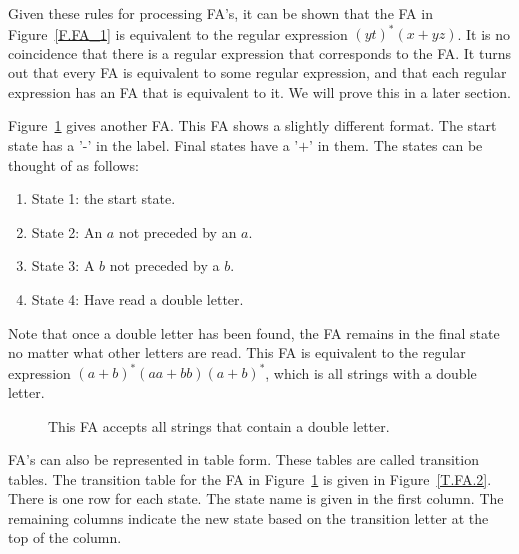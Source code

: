 \documentclass[letterpaper,12pt,openany,reqno]{book}%
\newcommand{\fanonterminalnode}[2] {\node at (#1) (#2) [circle, draw, minimum size=24pt] {#2};}
\newcommand{\fatransition}[3] {\draw [->] (#1) -- (#2) node [midway, above] {#3};}
\newcommand{\faarctransition}[5] {\draw [->] (#1) to[out=#4, in=#5] node  [midway, above] {#3} (#2) ;}
\newcommand{\faloopright}[2] {\draw (#1) edge [loop right] node {#2} ();}
\begin{document}
Given these rules for processing FA's, it can be shown that the FA in Figure~\ref{F.FA_1} is equivalent to the regular expression $(yt)^* (x + yz)$. It is no coincidence that there is a regular expression that corresponds to the FA. It turns out that every FA is equivalent to some regular expression, and that each regular expression has an FA that is equivalent to it. We will prove this in a later section.

Figure~\ref{F.FA_2} gives another FA. This FA shows a slightly different format. The start state has a '-' in the label. Final states have a '$+$' in them. The states can be thought of as follows:
\begin{enumerate}
\item State 1: the start state.
\item State 2: An $a$ not preceded by an $a$.
\item State 3: A $b$ not preceded by a $b$.
\item State 4: Have read a double letter.
\end{enumerate}
Note that once a double letter has been found, the FA remains in the final state no matter what other letters are read. This FA is equivalent to the regular expression $(a+b)^*(aa + bb)(a+b)^*$, which is all strings with a double letter.

\begin{figure}[hbt]
\centering
{}
 \caption[FA for double letters]{This FA accepts all strings that contain a double letter.}
  \label{F.FA_2}
\end{figure}

FA's can also be represented in table form. These tables are called transition tables. The transition table for the FA in Figure~\ref{F.FA_2} is given in Figure~\ref{T.FA.2}. There is one row for each state. The state name is given in the first column. The remaining columns indicate the new state based on the transition letter at the top of the column.
\end{document}
